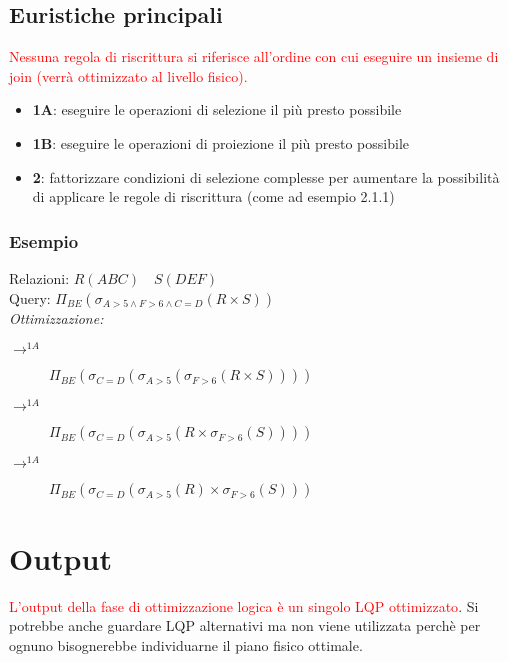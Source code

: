 \documentclass[12pt]{article}
\begin{document}
\subsection{Euristiche principali}
\textcolor{red}{Nessuna regola di riscrittura si riferisce all’ordine con cui
eseguire un insieme di join (verrà ottimizzato al livello fisico).}
\begin{itemize}
    \item \textbf{1A}: eseguire le operazioni di selezione il più presto possibile
    \item \textbf{1B}: eseguire le operazioni di proiezione il più presto possibile
    \item \textbf{2}: fattorizzare condizioni di selezione complesse per aumentare la possibilità di applicare le regole di riscrittura (come ad esempio 2.1.1)
\end{itemize}
\subsubsection{Esempio}
Relazioni: $R(ABC) \quad S(DEF)$ \\
Query: $\Pi_{BE}(\sigma_{A>5\land F>6 \land C=D}(R\times S))$\\
\textit{Ottimizzazione:}
\begin{description}
    \item[$\rightarrow^{1A}$] $\Pi_{BE}(\sigma_{C=D}(\sigma_{A>5}(\sigma_{F>6}(R\times S))))$
    \item[$\rightarrow^{1A}$] $\Pi_{BE}(\sigma_{C=D}(\sigma_{A>5}(R\times \sigma_{F>6}(S))))$
    \item[$\rightarrow^{1A}$] $\Pi_{BE}(\sigma_{C=D}(\sigma_{A>5}(R)\times \sigma_{F>6}(S)))$
\end{description}
\section{Output}
\textcolor{red}{L’output della fase di ottimizzazione logica è un singolo LQP ottimizzato}. Si potrebbe anche guardare LQP alternativi ma non viene utilizzata perchè per ognuno bisognerebbe individuarne il piano fisico ottimale.
\end{document}
